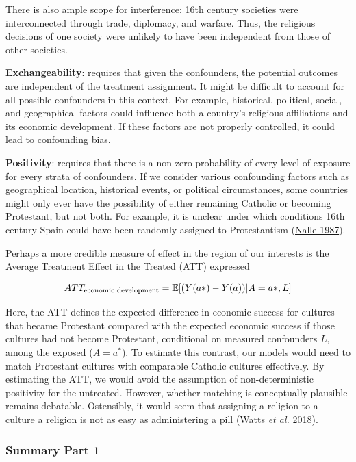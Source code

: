 \documentclass[
  singlecolumn]{article}
\begin{document}
There is also ample scope for interference: 16th century societies were
interconnected through trade, diplomacy, and warfare. Thus, the
religious decisions of one society were unlikely to have been
independent from those of other societies.

\textbf{Exchangeability}: requires that given the confounders, the
potential outcomes are independent of the treatment assignment. It might
be difficult to account for all possible confounders in this context.
For example, historical, political, social, and geographical factors
could influence both a country's religious affiliations and its economic
development. If these factors are not properly controlled, it could lead
to confounding bias.

\textbf{Positivity}: requires that there is a non-zero probability of
every level of exposure for every strata of confounders. If we consider
various confounding factors such as geographical location, historical
events, or political circumstances, some countries might only ever have
the possibility of either remaining Catholic or becoming Protestant, but
not both. For example, it is unclear under which conditions 16th century
Spain could have been randomly assigned to Protestantism
(\protect\hyperlink{ref-nalle1987}{Nalle 1987}).

Perhaps a more credible measure of effect in the region of our interests
is the Average Treatment Effect in the Treated (ATT) expressed

\[ATT_{\textnormal{economic~development}} = \mathbb{E}[(Y(a*)- Y(a))|A = a*,L]\]

Here, the ATT defines the expected difference in economic success for
cultures that became Protestant compared with the expected economic
success if those cultures had not become Protestant, conditional on
measured confounders \(L\), among the exposed (\(A = a^*\)). To estimate
this contrast, our models would need to match Protestant cultures with
comparable Catholic cultures effectively. By estimating the ATT, we
would avoid the assumption of non-deterministic positivity for the
untreated. However, whether matching is conceptually plausible remains
debatable. Ostensibly, it would seem that assigning a religion to a
culture a religion is not as easy as administering a pill
(\protect\hyperlink{ref-watts2018}{Watts \emph{et al.} 2018}).

\hypertarget{summary-part-1}{%
\subsubsection{Summary Part 1}\label{summary-part-1}}
\end{document}
